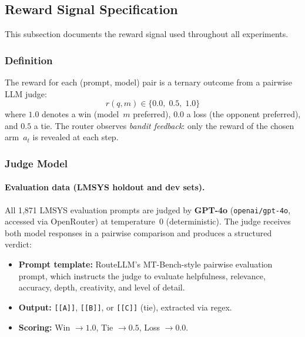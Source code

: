 
\subsection{Reward Signal Specification}
\label{appendix:reward_signal}

This subsection documents the reward signal used throughout all experiments.

\subsubsection{Definition}

The reward for each (prompt, model) pair is a ternary outcome from a pairwise
LLM judge:
\begin{equation}
r(q, m) \in \{0.0,\; 0.5,\; 1.0\}
\label{eq:reward_definition}
\end{equation}
where $1.0$ denotes a win (model~$m$ preferred), $0.0$ a loss (the opponent
preferred), and $0.5$ a tie.  The router observes \emph{bandit feedback}: only
the reward of the chosen arm~$a_t$ is revealed at each step.

\subsubsection{Judge Model}

\paragraph{Evaluation data (LMSYS holdout and dev sets).}
All 1,871 LMSYS evaluation prompts are judged by \textbf{GPT-4o}
(\texttt{openai/gpt-4o}, accessed via OpenRouter) at temperature~0
(deterministic).  The judge receives both model responses in a pairwise
comparison and produces a structured verdict:

\begin{itemize}[leftmargin=*,noitemsep]
    \item \textbf{Prompt template:} RouteLLM's MT-Bench-style pairwise
          evaluation prompt, which instructs the judge to evaluate
          helpfulness, relevance, accuracy, depth, creativity, and level
          of detail.
    \item \textbf{Output:} \texttt{[[A]]}, \texttt{[[B]]}, or \texttt{[[C]]}
          (tie), extracted via regex.
    \item \textbf{Scoring:} Win $\to 1.0$, Tie $\to 0.5$, Loss $\to 0.0$.
\end{itemize}

